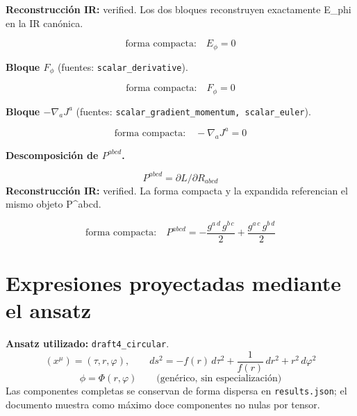 \documentclass[11pt]{article}
\begin{document}
\textbf{Reconstrucción IR:} verified. Los dos bloques reconstruyen exactamente E\_phi en la IR canónica.\par
\begin{dmath*}[breakdepth={5}]
\text{forma compacta:}\quad E_{\phi} = 0
\end{dmath*}
\par\smallskip\noindent\textbf{Bloque $ F_{\phi} $} (fuentes: \texttt{scalar\_derivative}).\par
\begin{dmath*}[breakdepth={5}]
\text{forma compacta:}\quad F_{\phi} = 0
\end{dmath*}
\par\smallskip\noindent\textbf{Bloque $ -\nabla_a J^a $} (fuentes: \texttt{scalar\_gradient\_momentum, scalar\_euler}).\par
\begin{dmath*}[breakdepth={5}]
\text{forma compacta:}\quad -\nabla_a J^a = 0
\end{dmath*}
\par\medskip\noindent\textbf{Descomposición de $ P^{abcd} $.}\par
\begin{dmath*}[breakdepth={5}]
P^{abcd}=\partial L/\partial R_{abcd}
\end{dmath*}
\textbf{Reconstrucción IR:} verified. La forma compacta y la expandida referencian el mismo objeto P^{abcd}.\par
\begin{dmath*}[breakdepth={5}]
\text{forma compacta:}\quad P^{abcd} = -\frac{g{}^{a\,d}\,g{}^{b\,c}}{2} + \frac{g{}^{a\,c}\,g{}^{b\,d}}{2}
\end{dmath*}
\section*{Expresiones proyectadas mediante el ansatz}
\textbf{Ansatz utilizado:} \texttt{draft4\_circular}.
\begin{dmath*}[breakdepth={3}]
(x^\mu)=\left(\tau, r, \varphi\right),\qquad ds^2 = -f\!\left(r\right)\,d\tau^2 + \frac{1}{f\!\left(r\right)}\,dr^2 + {r}^{2}\,d\varphi^2
\end{dmath*}
\begin{dmath*}[breakdepth={3}]
\phi = \Phi\!\left(r, \varphi\right)\qquad\text{(genérico, sin especialización)}
\end{dmath*}
Las componentes completas se conservan de forma dispersa en \texttt{results.json}; el documento muestra como máximo doce componentes no nulas por tensor.
\end{document}
